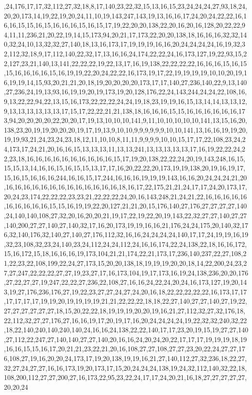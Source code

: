 ,24,176,17,17,32,112,27,32,18,8,17,140,23,22,32,15,13,16,15,23,24,24,24,27,93,18,24,20,20,173,14,19,22,19,20,24,11,10,19,143,247,143,19,13,16,16,17,24,20,24,22,22,16,16,16,15,15,16,15,16,16,16,15,16,15,17,19,22,20,20,138,22,20,16,20,16,128,20,22,22,94,11,11,236,21,20,22,19,14,15,173,94,20,21,17,173,22,20,20,138,18,16,16,16,32,32,140,32,24,10,13,32,32,27,140,18,13,16,173,17,19,19,19,16,16,20,24,24,24,24,16,19,32,32,112,32,18,9,17,112,140,22,32,17,13,16,16,24,174,22,22,24,16,173,127,19,22,93,15,22,127,23,21,140,13,141,22,22,22,19,22,13,17,16,19,138,22,22,22,22,16,16,16,15,16,15,15,16,16,16,16,15,16,19,19,22,20,24,22,22,16,173,19,17,22,19,19,19,19,10,10,20,19,16,19,19,14,15,93,20,21,21,20,18,19,20,20,20,20,173,17,17,140,27,236,140,22,9,13,140,27,236,24,19,13,93,16,19,19,20,19,173,19,20,128,176,22,24,143,244,24,24,22,108,16,9,13,22,22,94,22,13,15,16,173,22,22,22,24,24,19,18,23,19,19,16,15,13,14,14,13,13,12,9,13,13,13,13,13,13,17,15,17,22,22,21,21,138,18,16,16,16,15,15,16,16,16,16,16,16,173,94,20,20,20,20,22,20,20,17,19,13,10,10,10,141,9,11,10,10,10,10,10,141,13,15,16,20,138,23,20,19,19,20,20,20,19,17,19,13,9,10,10,9,9,9,9,9,9,10,10,141,13,16,16,19,19,20,19,19,93,21,24,23,24,23,18,12,11,10,10,8,11,11,9,9,9,9,10,10,15,17,17,22,108,23,24,24,173,17,24,21,20,16,16,15,13,13,13,11,13,13,241,13,13,13,13,13,17,16,19,22,22,24,22,23,18,16,16,16,16,16,16,16,16,16,16,15,17,19,20,138,22,22,24,20,19,143,248,16,15,15,15,13,14,16,16,15,16,15,15,13,17,17,16,20,22,22,20,173,19,19,138,20,19,16,19,17,15,16,15,16,16,16,244,16,16,15,17,244,16,16,16,19,19,19,143,16,16,20,24,24,24,21,20,16,16,16,16,16,16,16,16,16,16,16,16,16,18,16,17,22,175,21,21,24,17,17,24,20,173,17,20,24,23,174,22,22,22,23,23,21,22,22,22,24,20,16,143,248,21,24,21,22,16,16,16,16,16,16,16,16,16,16,15,15,16,19,19,22,20,127,21,21,20,15,176,140,27,176,27,27,27,27,140,24,140,140,108,27,32,20,16,20,20,21,19,17,22,19,22,20,19,143,22,32,27,27,140,27,27,140,200,27,27,140,27,140,32,17,16,20,173,19,19,16,16,21,176,24,24,175,20,140,32,176,32,140,176,32,140,27,140,27,176,112,32,16,16,24,24,24,24,140,17,17,24,19,19,16,19,32,23,108,32,23,24,140,23,24,112,24,24,112,24,16,16,174,22,24,138,22,18,16,16,172,15,16,172,15,18,16,16,16,19,173,104,21,21,174,22,21,173,17,236,140,237,22,27,108,21,22,23,22,108,199,22,24,27,173,15,20,20,138,18,19,19,19,20,20,18,14,22,200,24,23,27,27,247,22,22,22,27,27,19,23,27,17,16,173,104,19,17,173,16,19,24,138,236,20,20,176,27,22,27,27,19,247,22,22,27,236,22,108,27,16,16,24,22,24,20,24,16,173,127,19,20,143,19,27,176,236,176,27,19,22,23,27,27,24,27,24,20,16,18,22,22,22,22,22,16,173,17,17,17,17,17,17,19,19,20,19,19,19,19,21,21,22,22,22,18,18,22,27,140,27,27,140,27,19,22,27,27,27,27,27,27,18,15,20,22,22,18,19,19,19,20,20,19,16,21,27,112,32,27,32,176,18,22,112,32,27,27,176,27,16,16,19,17,20,19,17,16,20,24,24,24,24,19,22,32,32,240,32,22,18,22,140,240,140,240,140,24,16,16,24,138,22,22,140,17,17,23,20,19,15,19,27,27,140,27,112,22,247,27,140,140,27,27,140,20,16,16,24,20,24,20,22,17,17,17,19,19,19,18,19,16,16,15,15,16,17,20,21,21,23,22,21,20,16,108,27,27,108,27,27,23,20,22,24,27,27,176,108,27,19,16,20,20,24,173,17,19,20,138,19,19,16,21,27,140,112,27,32,236,18,22,27,32,27,24,27,27,16,16,173,19,20,173,17,15,20,24,24,24,138,19,24,32,112,140,32,22,18,108,200,112,27,27,200,27,16,173,22,95,23,22,24,17,17,24,20,21,16,18,27,27,27,27,27,20,20,24